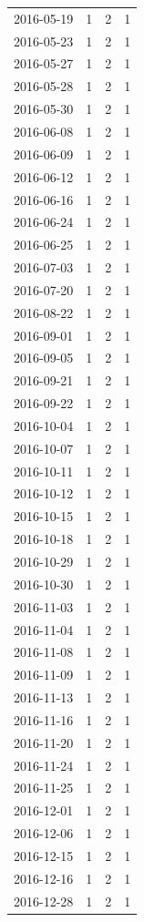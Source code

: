 \begin{tabular}{lrrr}
2016-05-19 & 1 & 2 & 1 \\
2016-05-23 & 1 & 2 & 1 \\
2016-05-27 & 1 & 2 & 1 \\
2016-05-28 & 1 & 2 & 1 \\
2016-05-30 & 1 & 2 & 1 \\
2016-06-08 & 1 & 2 & 1 \\
2016-06-09 & 1 & 2 & 1 \\
2016-06-12 & 1 & 2 & 1 \\
2016-06-16 & 1 & 2 & 1 \\
2016-06-24 & 1 & 2 & 1 \\
2016-06-25 & 1 & 2 & 1 \\
2016-07-03 & 1 & 2 & 1 \\
2016-07-20 & 1 & 2 & 1 \\
2016-08-22 & 1 & 2 & 1 \\
2016-09-01 & 1 & 2 & 1 \\
2016-09-05 & 1 & 2 & 1 \\
2016-09-21 & 1 & 2 & 1 \\
2016-09-22 & 1 & 2 & 1 \\
2016-10-04 & 1 & 2 & 1 \\
2016-10-07 & 1 & 2 & 1 \\
2016-10-11 & 1 & 2 & 1 \\
2016-10-12 & 1 & 2 & 1 \\
2016-10-15 & 1 & 2 & 1 \\
2016-10-18 & 1 & 2 & 1 \\
2016-10-29 & 1 & 2 & 1 \\
2016-10-30 & 1 & 2 & 1 \\
2016-11-03 & 1 & 2 & 1 \\
2016-11-04 & 1 & 2 & 1 \\
2016-11-08 & 1 & 2 & 1 \\
2016-11-09 & 1 & 2 & 1 \\
2016-11-13 & 1 & 2 & 1 \\
2016-11-16 & 1 & 2 & 1 \\
2016-11-20 & 1 & 2 & 1 \\
2016-11-24 & 1 & 2 & 1 \\
2016-11-25 & 1 & 2 & 1 \\
2016-12-01 & 1 & 2 & 1 \\
2016-12-06 & 1 & 2 & 1 \\
2016-12-15 & 1 & 2 & 1 \\
2016-12-16 & 1 & 2 & 1 \\
2016-12-28 & 1 & 2 & 1 \\

\end{tabular}
